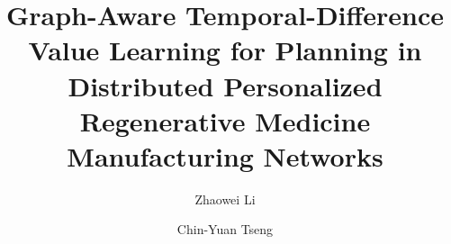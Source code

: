 \documentclass[preprint,12pt]{elsarticle}
\begin{document}
\begin{frontmatter}
\title{Graph-Aware Temporal-Difference Value Learning for Planning in Distributed Personalized Regenerative Medicine Manufacturing Networks}
\author[inst1]{Zhaowei Li}
\author[inst1]{Chin-Yuan Tseng}
\end{frontmatter}
\end{document}
